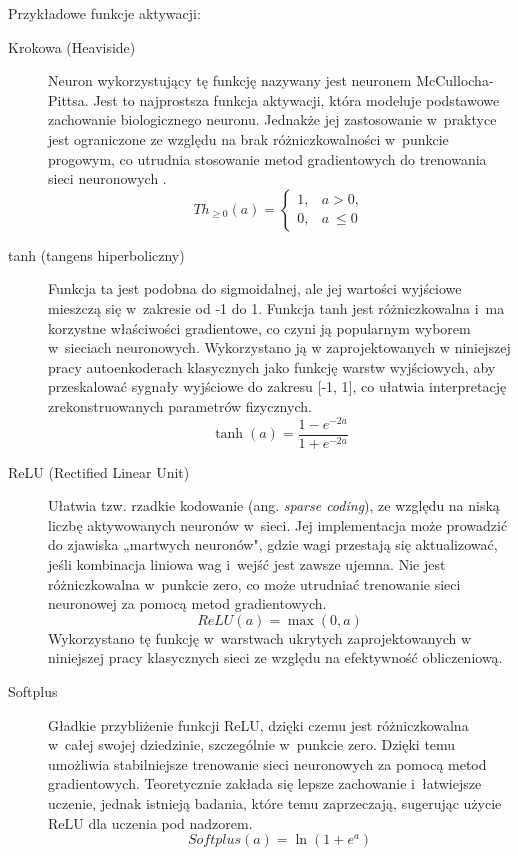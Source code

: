 Przykładowe funkcje aktywacji:
\begin{description}
    \item[Krokowa (Heaviside)] Neuron wykorzystujący tę funkcję nazywany jest neuronem McCullocha-Pittsa. Jest to najprostsza funkcja aktywacji, która modeluje podstawowe zachowanie biologicznego neuronu. Jednakże jej zastosowanie w~praktyce jest ograniczone ze względu na brak różniczkowalności w~punkcie progowym, co utrudnia stosowanie metod gradientowych do trenowania sieci neuronowych \cite{haykin2009neural}. 
    \[Th_{\geq 0}(a) = \begin{cases}1, & a>0, \\0, & a~\leq 0\end{cases}\]
    \item[tanh (tangens hiperboliczny)] Funkcja ta jest podobna do sigmoidalnej, ale jej wartości wyjściowe mieszczą się w~zakresie od -1 do 1. Funkcja tanh jest różniczkowalna i~ma korzystne właściwości gradientowe, co czyni ją popularnym wyborem w~sieciach neuronowych. Wykorzystano ją w zaprojektowanych w niniejszej pracy autoenkoderach klasycznych jako funkcję warstw wyjściowych, aby przeskalować sygnały wyjściowe do zakresu [-1, 1], co ułatwia interpretację zrekonstruowanych parametrów fizycznych. 
    \[\tanh(a) = \frac{1-e^{-2a}}{1+e^{-2a}}\]
    \item[ReLU (Rectified Linear Unit)] Ułatwia tzw. rzadkie kodowanie (ang. \textit{sparse coding}), ze względu na niską liczbę aktywowanych neuronów w~sieci. Jej implementacja może prowadzić do zjawiska „martwych neuronów", gdzie wagi przestają się aktualizować, jeśli kombinacja liniowa wag i~wejść jest zawsze ujemna. Nie jest różniczkowalna w~punkcie zero, co może utrudniać trenowanie sieci neuronowej za pomocą metod gradientowych. 
    \[ReLU(a) = \max(0, a)\]
    Wykorzystano tę funkcję w~warstwach ukrytych zaprojektowanych w niniejszej pracy klasycznych sieci ze względu na efektywność obliczeniową.
    \item [Softplus] Gładkie przybliżenie funkcji ReLU, dzięki czemu jest różniczkowalna w~całej swojej dziedzinie, szczególnie w~punkcie zero. Dzięki temu umożliwia stabilniejsze trenowanie sieci neuronowych za pomocą metod gradientowych. Teoretycznie zakłada się lepsze zachowanie i~łatwiejsze uczenie, jednak istnieją badania, które temu zaprzeczają, sugerując użycie ReLU dla uczenia pod nadzorem.\[Softplus(a) = \ln(1 + e^{a})\]

\end{description}

